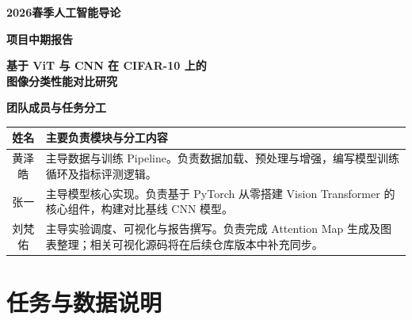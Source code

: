 \documentclass[a4paper, 12pt]{article}
\begin{document}
\begin{titlepage}
    \centering
    \vspace*{3cm}
    
    {\Huge \bfseries 2026春季人工智能导论\par}
    \vspace{1cm}
    {\LARGE \bfseries 项目中期报告\par}
    \vspace{1.5cm}
    
    {\Large \bfseries 基于 ViT 与 CNN 在 CIFAR-10 上的 \\ 图像分类性能对比研究\par}
    \vspace{3cm}
    
    {\large \bfseries 团队成员与任务分工}\par
    \vspace{0.5cm}
    
    \begin{table}[H]
    \centering
    \renewcommand{\arraystretch}{1.5}
    \begin{tabularx}{0.9\textwidth}{c|X}
        \toprule
        \textbf{姓名} & \textbf{主要负责模块与分工内容} \\
        \midrule
        黄泽皓 & 主导数据与训练 Pipeline。负责数据加载、预处理与增强，编写模型训练循环及指标评测逻辑。 \\
        \hline
        张一 & 主导模型核心实现。负责基于 PyTorch 从零搭建 Vision Transformer 的核心组件，构建对比基线 CNN 模型。 \\
        \hline
        刘梵佑 & 主导实验调度、可视化与报告撰写。负责完成 Attention Map 生成及图表整理；相关可视化源码将在后续仓库版本中补充同步。 \\
        \bottomrule
    \end{tabularx}
\end{table}
    
    \vfill
\end{titlepage}

\newpage

\section{任务与数据说明}
\end{document}
